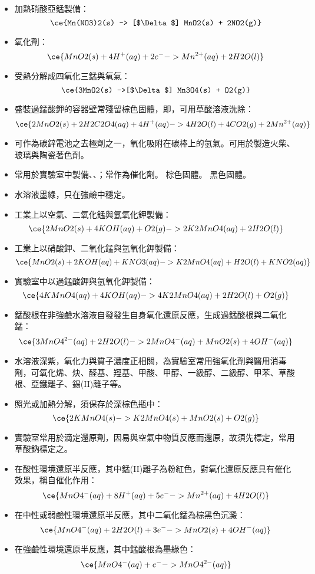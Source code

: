 \documentclass[a4paper,12pt]{report}
\begin{document}
\begin{itemize}
\begin{itemize}
\item 加熱硝酸亞錳製備：
\[\ce{Mn(NO3)2(s) -> [$\Delta$] MnO2(s) + 2NO2(g)}\]
\item 氧化劑：
\[\ce{MnO2(s) + 4H^+(aq) + 2e^- -> Mn^{2+}(aq) + 2H2O(l)}\]
\item 受熱分解成四氧化三錳與氧氣：
\[\ce{3MnO2(s) ->[$\Delta$] Mn3O4(s) + O2(g)}\]
\item 盛裝過錳酸鉀的容器壁常殘留棕色固體，即，可用草酸溶液洗除：
\[\ce{2MnO2(s) + 2H2C2O4(aq) + 4H^+(aq) -> 4H2O(l) + 4CO2(g) + 2Mn^{2+}(aq)}\]
\item 可作為碳鋅電池之去極劑之一，氧化吸附在碳棒上的氫氣。可用於製造火柴、玻璃與陶瓷著色劑。
\item 常用於實驗室中製備、、；常作為催化劑。
\eit
{}
棕色固體。
黑色固體。
\bit
\item 水溶液墨綠，只在強鹼中穩定。
\item 工業上以空氣、二氧化錳與氫氧化鉀製備：
\[\ce{2MnO2(s) + 4KOH(aq) + O2(g) -> 2K2MnO4(aq) + 2H2O(l)}\]
\item 工業上以硝酸鉀、二氧化錳與氫氧化鉀製備：
\[\ce{MnO2(s) + 2KOH(aq) + KNO3(aq) -> K2MnO4(aq) + H2O(l) + KNO2(aq)}\]
\item 實驗室中以過錳酸鉀與氫氧化鉀製備：
\[\ce{4KMnO4(aq) + 4KOH(aq) -> 4K2MnO4(aq) + 2H2O(l) + O2(g)}\]
\item 錳酸根在非強鹼水溶液自發發生自身氧化還原反應，生成過錳酸根與二氧化錳：
\[\ce{3MnO4^{2-}(aq) + 2H2O(l) -> 2MnO4^-(aq) + MnO2(s) + 4OH^-(aq)}\]
\eit
{}
\bit
\item 水溶液深紫，氧化力與質子濃度正相關，為實驗室常用強氧化劑與醫用消毒劑，可氧化烯、炔、醛基、羥基、甲酸、甲醇、一級醇、二級醇、甲苯、草酸根、亞鐵離子、錫(II)離子等。
\item 照光或加熱分解，須保存於深棕色瓶中：
\[\ce{2KMnO4(s) -> K2MnO4(s) + MnO2(s) + O2(g)}\]
\item 實驗室常用於滴定還原劑，因易與空氣中物質反應而還原，故須先標定，常用草酸鈉標定之。
\item 在酸性環境還原半反應，其中錳(II)離子為粉紅色，對氧化還原反應具有催化效果，稱自催化作用：
\[\ce{MnO4^-(aq) + 8H^+(aq) + 5e^- -> Mn^{2+}(aq) + 4H2O(l)}\]
\item 在中性或弱鹼性環境還原半反應，其中二氧化錳為棕黑色沉澱：
\[\ce{MnO4^-(aq) + 2H2O(l) + 3e^- -> MnO2(s) + 4OH^-(aq)}\]
\item 在強鹼性環境還原半反應，其中錳酸根為墨綠色：
\[\ce{MnO4^-(aq) + e^- -> MnO4^{2-}(aq)}\]
\eit
{}

\end{itemize}
\end{itemize}
\end{document}
